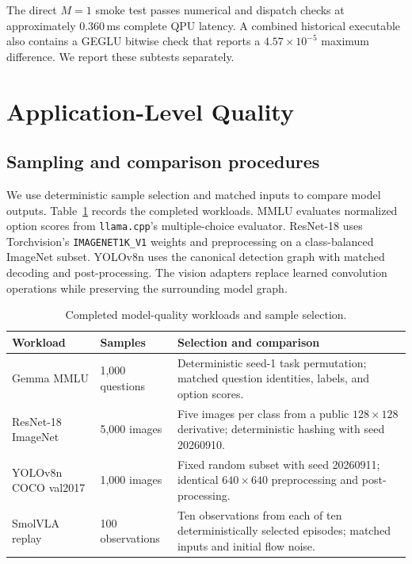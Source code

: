 \documentclass[sigplan,screen,review]{acmart}
\begin{document}
The direct \(M=1\) smoke test passes numerical and dispatch checks at approximately 0.360\,ms complete QPU latency. A combined historical executable also contains a GEGLU bitwise check that reports a \(4.57\times10^{-5}\) maximum difference. We report these subtests separately.

\section{Application-Level Quality}
\label{app:quality}

\subsection{Sampling and comparison procedures}

We use deterministic sample selection and matched inputs to compare model outputs. Table~\ref{tab:quality-sampling} records the completed workloads. MMLU evaluates normalized option scores from \texttt{llama.cpp}'s multiple-choice evaluator. ResNet-18 uses Torchvision's \texttt{IMAGENET1K\_V1} weights and preprocessing on a class-balanced ImageNet subset. YOLOv8n uses the canonical detection graph with matched decoding and post-processing. The vision adapters replace learned convolution operations while preserving the surrounding model graph.

\begin{table}[t]
\centering
\caption{Completed model-quality workloads and sample selection.}
\label{tab:quality-sampling}
\small
\begin{tabularx}{\textwidth}{@{}l l X@{}}
\toprule
Workload & Samples & Selection and comparison \\
\midrule
Gemma MMLU & 1,000 questions &
Deterministic seed-1 task permutation; matched question identities, labels, and option scores. \\
ResNet-18 ImageNet & 5,000 images &
Five images per class from a public $128\times128$ derivative; deterministic hashing with seed 20260910. \\
YOLOv8n COCO val2017 & 1,000 images &
Fixed random subset with seed 20260911; identical $640\times640$ preprocessing and post-processing. \\
SmolVLA replay & 100 observations &
Ten observations from each of ten deterministically selected episodes; matched inputs and initial flow noise. \\
\bottomrule
\end{tabularx}
\end{table}
\end{document}
